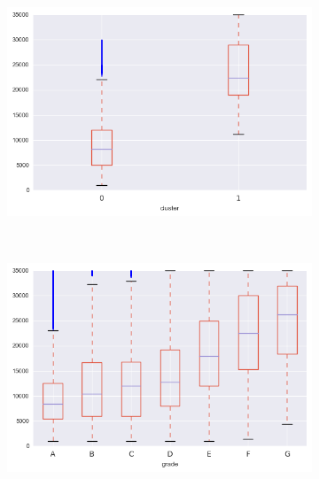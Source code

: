 \begin{apendicesenv}
\begin{figure}[t!]
\begin{subfigure}[t]{0.5\textwidth}
    	\end{subfigure}
    	\\
    	        \caption{funded\textunderscore amnt}
    	\begin{subfigure}[t]{0.5\textwidth}
    		\centering

			\centerline{\includegraphics[width=1.05\textwidth]{img/funded_amnt_by_cluster}}
    	\end{subfigure}%
    	~ 
    	\begin{subfigure}[t]{0.5\textwidth}
    		\centering
   
			\centerline{\includegraphics[width=1.05\textwidth]{img/funded_amnt_by_grade}}

    	\end{subfigure}

\end{figure}


\end{apendicesenv}
